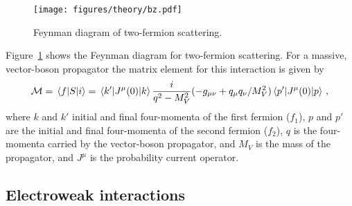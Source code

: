   \begin{figure}[ht]
    \centering
    \texttt{[image: figures/theory/bz.pdf]}
    \caption{Feynman diagram of two-fermion scattering.}
    \label{fig:feynmantwofermion}
  \end{figure}

  Figure~\ref{fig:feynmantwofermion} shows the Feynman diagram for two-fermion
  scattering. For a massive, vector-boson propagator the matrix element for
  this interaction is given by
  \begin{equation}\label{eq:genmatel}
    \mathcal{M} = \mel{f}{S}{i} = \mel{k'}{J^{\mu}(0)}{k} \frac{i}{q^2 - M_V^2}(-g_{\mu\nu} 
            + q_{\mu}q_{\nu}/M_V^2) \mel{p'}{J^{\mu}(0)}{p} \,,
  \end{equation}
  where $k$ and $k'$ initial and final four-momenta of the first fermion
  ($f_1$), $p$ and $p'$ are the initial and final four-momenta of the second
  fermion ($f_2$), $q$ is the four-momenta carried by the vector-boson
  propagator, and $M_V$ is the mass of the propagator, and $J^{\mu}$ is the
  probability current operator.


\subsection{Electroweak interactions}

